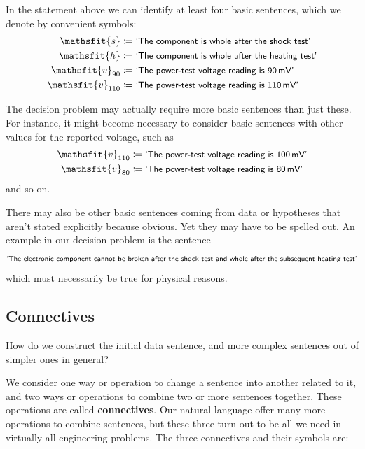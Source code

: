 \documentclass[
  a4paper,
  DIV=11,
  numbers=noendperiod,
  oneside]{scrreprt}
\begin{document}
In the statement above we can identify at least four basic sentences,
which we denote by convenient symbols: \begin{align*}
\mathsfit{s} &\coloneqq \textsf{\small`The component is whole after the shock test'}
\\
\mathsfit{h} &\coloneqq \textsf{\small`The component is whole after the heating test'}
\\
\mathsfit{v}_{90} &\coloneqq \textsf{\small`The power-test voltage reading is 90\,mV'}
\\
\mathsfit{v}_{110} &\coloneqq \textsf{\small`The power-test voltage reading is 110\,mV'}
\end{align*}

The decision problem may actually require more basic sentences than just
these. For instance, it might become necessary to consider basic
sentences with other values for the reported voltage, such as
\[\begin{aligned}
\mathsfit{v}_{110} &\coloneqq \textsf{\small`The power-test voltage reading is 100\,mV'}
\\
\mathsfit{v}_{80} &\coloneqq \textsf{\small`The power-test voltage reading is 80\,mV'}
\end{aligned}\] and so on.

There may also be other basic sentences coming from data or hypotheses
that aren't stated explicitly because obvious. Yet they may have to be
spelled out. An example in our decision problem is the sentence \[
\textsf{\small`The electronic component cannot be broken after the shock test and whole after the subsequent heating test'}
\] which must necessarily be true for physical reasons.

\hypertarget{connectives}{%
\subsection{Connectives}\label{connectives}}

How do we construct the initial data sentence, and more complex
sentences out of simpler ones in general?

We consider one way or operation to change a sentence into another
related to it, and two ways or operations to combine two or more
sentences together. These operations are called {\textbf{connectives}}.
Our natural language offer many more operations to combine sentences,
but these three turn out to be all we need in virtually all engineering
problems. The three connectives and their symbols are:
\end{document}
